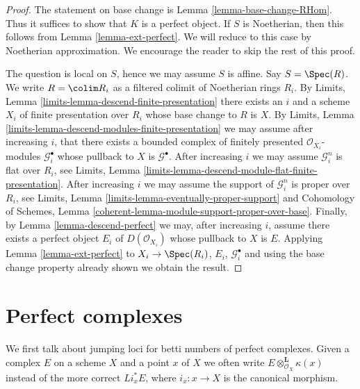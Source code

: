 \begin{proof}
The statement on base change is Lemma \ref{lemma-base-change-RHom}.
Thus it suffices to show that $K$ is a perfect object. If $S$ is
Noetherian, then this follows from
Lemma \ref{lemma-ext-perfect}.
We will reduce to this case by Noetherian approximation.
We encourage the reader to skip the rest of this proof.

\medskip\noindent
The question is local on $S$, hence we may assume $S$ is affine.
Say $S = \Spec(R)$. We write $R = \colim R_i$ as a filtered colimit
of Noetherian rings $R_i$. By Limits, Lemma
\ref{limits-lemma-descend-finite-presentation}
there exists an $i$ and a scheme $X_i$ of finite presentation over $R_i$
whose base change to $R$ is $X$. By
Limits, Lemma \ref{limits-lemma-descend-modules-finite-presentation}
we may assume after increasing $i$, that there exists a bounded complex
of finitely presented $\mathcal{O}_{X_i}$-modules $\mathcal{G}_i^\bullet$
whose pullback to $X$ is $\mathcal{G}^\bullet$. After increasing $i$
we may assume $\mathcal{G}_i^n$ is flat over $R_i$, see
Limits, Lemma \ref{limits-lemma-descend-module-flat-finite-presentation}.
After increasing $i$ we may assume the support of $\mathcal{G}_i^n$
is proper over $R_i$, see
Limits, Lemma \ref{limits-lemma-eventually-proper-support} and
Cohomology of Schemes, Lemma
\ref{coherent-lemma-module-support-proper-over-base}.
Finally, by Lemma \ref{lemma-descend-perfect}
we may, after increasing $i$, assume there exists a perfect
object $E_i$ of $D(\mathcal{O}_{X_i})$ whose pullback to
$X$ is $E$. Applying Lemma \ref{lemma-ext-perfect}
to $X_i \to \Spec(R_i)$, $E_i$, $\mathcal{G}_i^\bullet$ and using the
base change property already shown we obtain the result.
\end{proof}









\section{Perfect complexes}
\label{section-perfect-complexes}

\noindent
We first talk about jumping loci for betti numbers of perfect complexes.
Given a complex $E$ on a scheme $X$ and a point $x$ of $X$ we often write
$E \otimes_{\mathcal{O}_X}^\mathbf{L} \kappa(x)$ instead of the more correct
$Li_x^*E$, where $i_x : x \to X$ is the canonical morphism.

